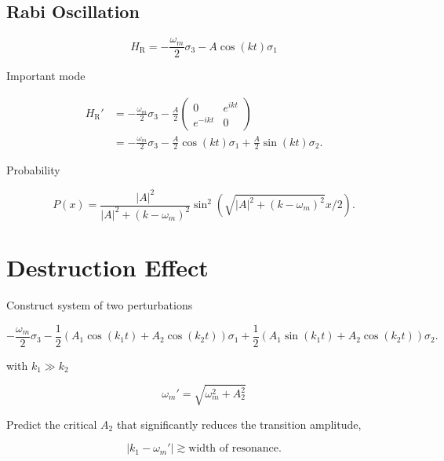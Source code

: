 \documentclass[%
preprint,
 amsmath,amssymb,
 aps,
]{revtex4-1}
\begin{document}
\subsection{Rabi Oscillation}



\begin{equation}
H_{\mathrm R} = -\frac{\omega_m}{2} \sigma_3 - A \cos(k t) \sigma_1
\end{equation}

Important mode

\begin{align}
H_{\mathrm R}' &= -\frac{\omega_m}{2} \sigma_3 - \frac{A}{2} \begin{pmatrix}0 & e^{i k t} \\ e^{-i k t} & 0 \end{pmatrix} \\
& =  -\frac{\omega_m}{2} \sigma_3 - \frac{A}{2} \cos(kt) \sigma_1 + \frac{A}{2} \sin (kt) \sigma_2.
\end{align}

Probability

\begin{equation}
P(x) = \frac{\lvert A\rvert^2}{ \lvert A\rvert^2 + (k - \omega_m)^2 }  \sin^2 \left( \sqrt{ \lvert A\rvert^2 + (k - \omega_m)^2 } x/2 \right).
\end{equation}





\section{Destruction Effect}

Construct system of two perturbations

\begin{equation}
-\frac{\omega_m}{2} \sigma_3 - \frac{1}{2} \left(A_1 \cos(k_1 t) + A_2 \cos(k_2t) \right) \sigma_1 + \frac{1}{2} \left( A_1 \sin (k_1t) + A_2 \cos(k_2t) \right) \sigma_2.
\end{equation}

with $k_1 \gg k_2$

\begin{equation}
\omega_m' = \sqrt{\omega_m^2 + A_2^2}
\end{equation}

Predict the critical $A_2$ that significantly reduces the transition amplitude,

\begin{equation}
\lvert k_1 - \omega_m' \rvert \gtrsim \text{width of resonance}.
\end{equation}
\end{document}
